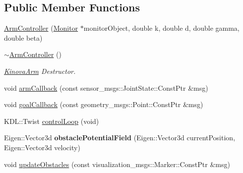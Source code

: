\subsection*{Public Member Functions}
\begin{DoxyCompactItemize}
\item 
\hyperlink{class_arm_controller_a27a8d755210b8e3bd96217ea8080b327}{Arm\+Controller} (\hyperlink{class_monitor}{Monitor} $\ast$monitor\+Object, double k, double d, double gamma, double beta)
\item 
\hyperlink{class_arm_controller_ad2b44ab21366148d89980e942b26d232}{$\sim$\+Arm\+Controller} ()\hypertarget{class_arm_controller_ad2b44ab21366148d89980e942b26d232}{}\label{class_arm_controller_ad2b44ab21366148d89980e942b26d232}

\begin{DoxyCompactList}\small\item\em \hyperlink{class_kinova_arm}{Kinova\+Arm} Destructor. \end{DoxyCompactList}\item 
void \hyperlink{class_arm_controller_a29defeb3894d62016523a99b63320a22}{arm\+Callback} (const sensor\+\_\+msgs\+::\+Joint\+State\+::\+Const\+Ptr \&msg)
\item 
void \hyperlink{class_arm_controller_acbd85ddee96c8d6fd76728c68fb12d3c}{goal\+Callback} (const geometry\+\_\+msgs\+::\+Point\+::\+Const\+Ptr \&msg)
\item 
K\+D\+L\+::\+Twist \hyperlink{class_arm_controller_ad7e00a70c968a23087415b1bd0ac8bf1}{control\+Loop} (void)
\item 
Eigen\+::\+Vector3d {\bfseries obstacle\+Potential\+Field} (Eigen\+::\+Vector3d current\+Position, Eigen\+::\+Vector3d velocity)\hypertarget{class_arm_controller_ad0b1f28333e2a3be76258153a745803d}{}\label{class_arm_controller_ad0b1f28333e2a3be76258153a745803d}

\item 
void \hyperlink{class_arm_controller_a17d05bd19286dc4e04355e3d4f6bb372}{update\+Obstacles} (const visualization\+\_\+msgs\+::\+Marker\+::\+Const\+Ptr \&msg)
\end{DoxyCompactItemize}
